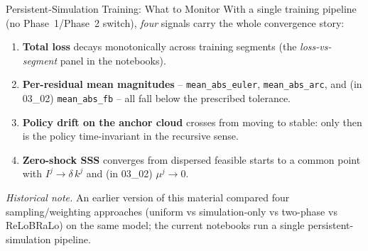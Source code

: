 \documentclass[aspectratio=169,11pt]{beamer}
\newcommand{\emphc}[1]{\textcolor{harvardcrimson}{#1}}
\begin{document}
\begin{frame}{Persistent-Simulation Training: What to Monitor}
With a single training pipeline (no Phase~1/Phase~2 switch), \emph{four} signals carry the whole convergence story:

\vspace{0.3em}
\begin{enumerate}\itemsep3pt
    \item \textbf{Total loss} decays monotonically across training segments (the \emph{loss-vs-segment} panel in the notebooks).
    \item \textbf{Per-residual mean magnitudes} -- \texttt{mean\_abs\_euler}, \texttt{mean\_abs\_arc}, and (in 03\_02) \texttt{mean\_abs\_fb} -- all fall below the prescribed tolerance.
    \item \textbf{Policy drift on the anchor cloud} crosses from \emphc{moving} to \emphc{stable}: only then is the policy time-invariant in the recursive sense.
    \item \textbf{Zero-shock SSS} converges from dispersed feasible starts to a common point with $I^j \to \delta\,k^j$ and (in 03\_02) $\mu^j \to 0$.
\end{enumerate}

\vspace{0.4em}
{\footnotesize \emph{Historical note.}  An earlier version of this material compared four sampling/weighting approaches (uniform vs simulation-only vs two-phase vs ReLoBRaLo) on the same model; the current notebooks run a single persistent-simulation pipeline.}
\end{frame}
\end{document}
